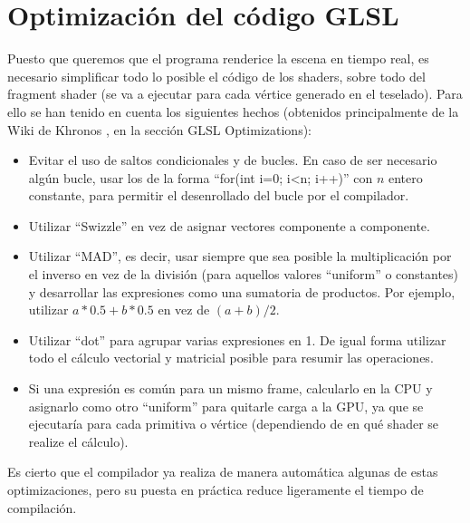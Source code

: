 \section*{Optimización del código GLSL}
	Puesto que queremos que el programa renderice la escena en tiempo real, es necesario simplificar todo lo posible el código de los shaders, sobre todo del fragment shader (se va a ejecutar para cada vértice generado en el teselado). Para ello se han tenido en cuenta los siguientes hechos (obtenidos principalmente de la Wiki de Khronos \cite{KhronosWiki}, en la sección GLSL Optimizations):
	\begin{itemize}
		\item Evitar el uso de saltos condicionales y de bucles. En caso de ser necesario algún bucle, usar los de la forma ``for(int i=$0$; i<n; i++)'' con $n$ entero constante, para permitir el desenrollado del bucle por el compilador.
		\item Utilizar ``Swizzle'' en vez de asignar vectores componente a componente.
		\item Utilizar ``MAD'', es decir, usar siempre que sea posible la multiplicación por el inverso en vez de la división (para aquellos valores ``uniform'' o constantes) y desarrollar las expresiones como una sumatoria de productos. Por ejemplo, utilizar $a*0.5 + b*0.5$ en vez de $(a+b)/2$.
		\item Utilizar ``dot'' para agrupar varias expresiones en 1. De igual forma utilizar todo el cálculo vectorial y matricial posible para resumir las operaciones.
		\item Si una expresión es común para un mismo frame, calcularlo en la CPU y asignarlo como otro ``uniform'' para quitarle carga a la GPU, ya que se ejecutaría para cada primitiva o vértice (dependiendo de en qué shader se realize el cálculo).
	\end{itemize}
	
	Es cierto que el compilador ya realiza de manera automática algunas de estas optimizaciones, pero su puesta en práctica reduce ligeramente el tiempo de compilación.

